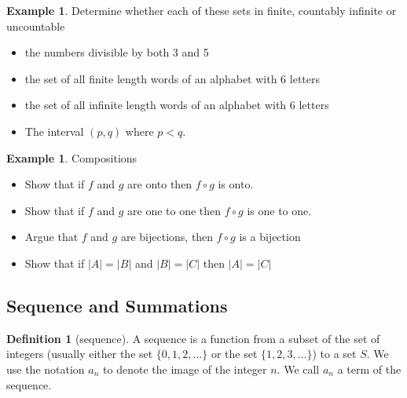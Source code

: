 \documentclass[letterpaper,10pt]{article}
\theoremstyle{plain}
\theoremstyle{definition}
\newtheorem{defn}[thm]{Definition}
\newtheorem{exmp}[thm]{Example}
\theoremstyle{remark}
\begin{document}
\newpage
\begin{exmp}
Determine whether each of these sets in finite, countably infinite or uncountable
\begin{itemize}
\item the numbers divisible by both 3 and 5
\vspace{1cm}
\item the set of all finite length words of an alphabet with 6 letters
\vspace{1cm}
\item the set of all infinite length words of an alphabet with 6 letters
\vspace{1cm}
\item The interval $(p,q)$ where $p<q$.
\end{itemize}
\end{exmp}
\newpage
\begin{exmp}{Compositions}
\begin{itemize}
\item Show that if $f$ and $g$ are onto then $f \circ g$ is onto. 
\vspace{3cm}
\item Show that if $f$ and $g$ are one to one then $f \circ g$ is one to one. 
\vspace{3cm}
\item Argue that $f$ and $g$ are bijections, then $f \circ g$ is a bijection
\vspace{1cm}
\item Show that if $|A|=|B|$ and $|B|=|C|$ then $|A|=|C|$
\vspace{3cm}
\end{itemize}
\end{exmp}

\newpage

\subsection{Sequence and Summations}
\begin{defn}[sequence]
A sequence is a function from a subset of the set of integers (usually either the set $\{0, 1, 2, \ldots\}$ or the set $\{1, 2, 3, \ldots\}$) to a set $S$. We use the notation $a_n$ to denote the image of the integer $n$. We call $a_n$ a term of the sequence.
\end{defn}
\end{document}
